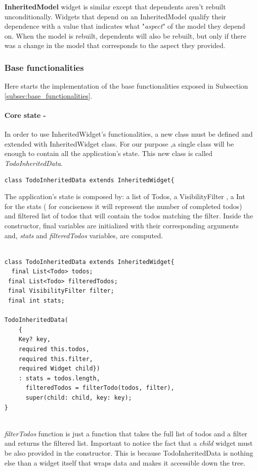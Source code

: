 \textbf{InheritedModel} widget is similar except that dependents aren't rebuilt unconditionally.
Widgets that depend on an InheritedModel qualify their dependence with a value that indicates what "\textit{aspect}" of the model they depend on. When the model is rebuilt, dependents will also be rebuilt, but only if there was a change in the model that corresponds to the aspect they provided.
\subsubsection{Base functionalities} 
\label{par:todo_app_inherited_widget_base_app}
Here starts the implementation of the base functionalities exposed in Subsection \ref{subsec:base_functionalities}.
\paragraph{Core state - }
\label{subpar:todo_app_inherited_widget_core_state}
In order to use InheritedWidget's functionalities, a new class must be defined and extended with InheritedWidget class. For our purpose ,a single class will be enough to contain all the application's state. This new class is called \textit{TodoInheritedData}.
\begin{code}
\mbox{}
 \mbox{}
		\label{code:2.14}
\begin{verbatim}
class TodoInheritedData extends InheritedWidget{
\end{verbatim}
\mbox{}
\end{code}

The application's state is composed by: a list of Todos, a VisibilityFilter , a Int for the stats ( for conciseness it will represent the number of completed todos) and filtered list of todos that will contain the todos matching the filter. Inside the constructor, final variables are initialized with their corresponding arguments and, \textit{stats} and \textit{filteredTodos} variables, are computed. 
\mbox{}\\
\begin{code}
\mbox{}
\label{code:2.15}
\begin{verbatim}

class TodoInheritedData extends InheritedWidget{
  final List<Todo> todos;
 final List<Todo> filteredTodos;
 final VisibilityFilter filter;
 final int stats;
 
TodoInheritedData(
    { 
    Key? key,
    required this.todos,
    required this.filter,
    required Widget child})
    : stats = todos.length,
      filteredTodos = filterTodo(todos, filter),
      super(child: child, key: key);
}
\end{verbatim}
\end{code}
\mbox{}\\
\textit{filterTodos} function is just a function that takes the full list of todos and a filter and returns the filtered list. Important to notice  the fact that a \textit{child} widget must be also provided in the constructor. This is because TodoInheritedData is nothing else than a widget itself that wraps data and makes it accessible down the tree.

